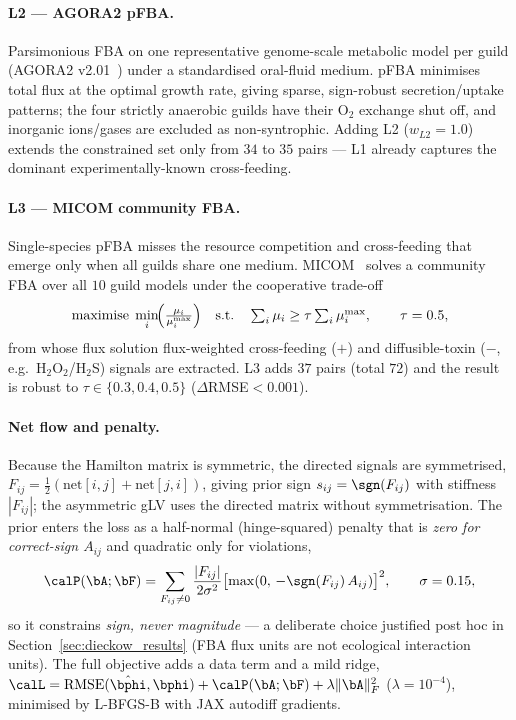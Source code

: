 \paragraph{L2 --- AGORA2 pFBA.} Parsimonious FBA on one representative genome-scale
metabolic model per guild (AGORA2 v2.01~\cite{Heinken2023AGORA2}) under a standardised
oral-fluid medium. pFBA minimises total flux at the optimal growth rate, giving
sparse, sign-robust secretion/uptake patterns; the four strictly anaerobic guilds
have their O$_2$ exchange shut off, and inorganic ions/gases are excluded as
non-syntrophic. Adding L2 ($w_{L2}=1.0$) extends the constrained set only from $34$
to $35$ pairs --- L1 already captures the dominant experimentally-known
cross-feeding.

\paragraph{L3 --- MICOM community FBA.} Single-species pFBA misses the resource
competition and cross-feeding that emerge only when all guilds share one medium.
MICOM~\cite{Diener2020MICOM} solves a community FBA over all $10$ guild models under the
cooperative trade-off
\begin{equation}
  \text{maximise}\;\min_i\!\Bigl(\tfrac{\mu_i}{\mu_i^{\max}}\Bigr)
  \quad\text{s.t.}\quad \textstyle\sum_i\mu_i\geq\tau\sum_i\mu_i^{\max},
  \qquad \tau=0.5,
  \label{eq:dieckow_micom}
\end{equation}
from whose flux solution flux-weighted cross-feeding ($+$) and diffusible-toxin
($-$, e.g.\ H$_2$O$_2$/H$_2$S) signals are extracted. L3 adds $37$ pairs (total
$72$) and the result is robust to $\tau\in\{0.3,0.4,0.5\}$ ($\Delta$RMSE$<0.001$).

\paragraph{Net flow and penalty.} Because the Hamilton matrix is symmetric, the
directed signals are symmetrised, $F_{ij}=\tfrac12(\mathrm{net}[i,j]+\mathrm{net}[j,i])$,
giving prior sign $s_{ij}=\sgn(F_{ij})$ with stiffness $|F_{ij}|$; the asymmetric
gLV uses the directed matrix without symmetrisation. The prior enters the loss as a
half-normal (hinge-squared) penalty that is \emph{zero for correct-sign $A_{ij}$}
and quadratic only for violations,
\begin{equation}
  \calP(\bA;\bF)
  = \sum_{F_{ij}\neq0}\frac{|F_{ij}|}{2\sigma^2}
    \bigl[\max(0,\,-\sgn(F_{ij})\,A_{ij})\bigr]^2,
  \qquad \sigma=0.15,
  \label{eq:dieckow_penalty}
\end{equation}
so it constrains \emph{sign, never magnitude} --- a deliberate choice justified
post hoc in Section~\ref{sec:dieckow_results} (FBA flux units are not ecological
interaction units). The full objective adds a data term and a mild ridge,
$\calL=\mathrm{RMSE}(\hat\bphi,\bphi)+\calP(\bA;\bF)+\lambda\|\bA\|_F^2$
($\lambda=10^{-4}$), minimised by L-BFGS-B with JAX autodiff gradients.

